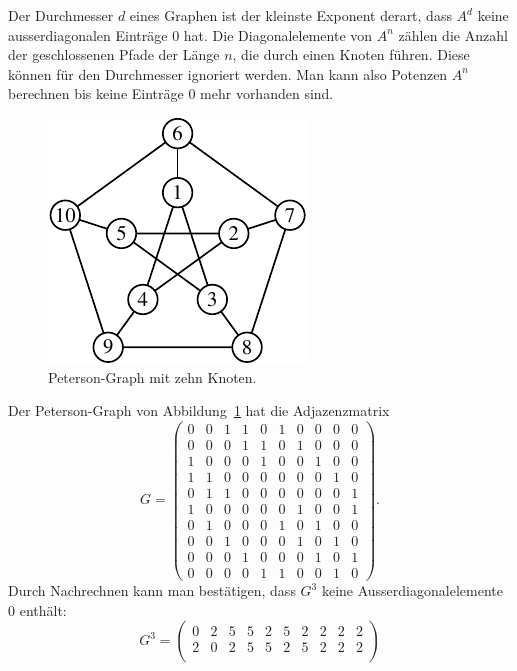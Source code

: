 Der Durchmesser $d$ eines Graphen ist der kleinste Exponent derart,
dass $A^d$ keine ausserdiagonalen Einträge $0$ hat.
Die Diagonalelemente von $A^n$ zählen die Anzahl der geschlossenen Pfade
der Länge $n$, die durch einen Knoten führen.
Diese können für den Durchmesser ignoriert werden.
Man kann also Potenzen $A^n$ berechnen bis keine Einträge $0$ mehr vorhanden
sind.

\begin{beispiel}
\begin{figure}
\centering
\includegraphics{chapters/70-graphen/images/peterson.pdf}
\caption{Peterson-Graph mit zehn Knoten.
\label{buch:figure:peterson}}
\end{figure}
Der Peterson-Graph von Abbildung~\ref{buch:figure:peterson}
hat die Adjazenzmatrix
\[
G
=
\begin{pmatrix}
 0& 0& 1& 1& 0& 1& 0& 0& 0& 0\\ %
 0& 0& 0& 1& 1& 0& 1& 0& 0& 0\\ %
 1& 0& 0& 0& 1& 0& 0& 1& 0& 0\\ %
 1& 1& 0& 0& 0& 0& 0& 0& 1& 0\\ %
 0& 1& 1& 0& 0& 0& 0& 0& 0& 1\\ %
 1& 0& 0& 0& 0& 0& 1& 0& 0& 1\\ %
 0& 1& 0& 0& 0& 1& 0& 1& 0& 0\\ %
 0& 0& 1& 0& 0& 0& 1& 0& 1& 0\\ %
 0& 0& 0& 1& 0& 0& 0& 1& 0& 1\\ %
 0& 0& 0& 0& 1& 1& 0& 0& 1& 0   %
\end{pmatrix}.
\]
Durch Nachrechnen kann man bestätigen, dass $G^3$ keine
Ausserdiagonalelemente $0$ enthält:
\[
G^3
=
\begin{pmatrix}
 0& 2& 5& 5& 2& 5& 2& 2& 2& 2\\
 2& 0& 2& 5& 5& 2& 5& 2& 2& 2\\

\end{pmatrix}\]
\end{beispiel}
